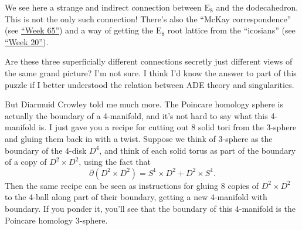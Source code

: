 \documentclass{article}
\begin{document}
We see here a strange and indirect connection between \(\mathrm{E}_8\)
and the dodecahedron. This is not the only such connection! There's also
the ``McKay correspondence'' (see \protect\hyperlink{week65}{``Week
65''}) and a way of getting the \(\mathrm{E}_8\) root lattice from the
``icosians'' (see \protect\hyperlink{week20}{``Week 20''}).

Are these three superficially different connections secretly just
different views of the same grand picture? I'm not sure. I think I'd
know the answer to part of this puzzle if I better understood the
relation between ADE theory and singularities.

But Diarmuid Crowley told me much more. The Poincare homology sphere is
actually the boundary of a 4-manifold, and it's not hard to say what
this 4-manifold is. I just gave you a recipe for cutting out 8 solid
tori from the 3-sphere and gluing them back in with a twist. Suppose we
think of 3-sphere as the boundary of the 4-disk \(D^4\), and think of
each solid torus as part of the boundary of a copy of
\(D^2 \times D^2\), using the fact that
\[\partial(D^2\times D^2) = S^1\times D^2 + D^2\times S^1.\] Then the
same recipe can be seen as instructions for gluing 8 copies of
\(D^2\times D^2\) to the 4-ball along part of their boundary, getting a
new 4-manifold with boundary. If you ponder it, you'll see that the
boundary of this 4-manifold is the Poincare homology 3-sphere.
\end{document}
